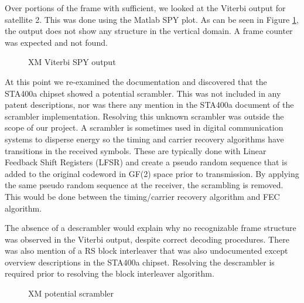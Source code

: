 \documentclass[conference,onecolumn]{IEEEtran}
\begin{document}
Over portions of the frame with sufficient, we looked at the Viterbi output for satellite 2.  This was done using the Matlab SPY plot.  As can be seen in Figure \ref{fig::Viterbi_spy}, the output does not show any structure in the vertical domain.  A frame counter was expected and not found.

\begin{figure}[H]
	\centerline{}
	\caption{XM Viterbi SPY output}
	\label{fig::Viterbi_spy}
\end{figure}

At this point we re-examined the documentation and discovered that the STA400a chipset showed a potential scrambler.  This was not included in any patent descriptions, nor was there any mention in the STA400a document of the scrambler implementation.  Resolving this unknown scrambler was outside the scope of our project.  A scrambler is sometimes used in digital communication systems to disperse energy so the timing and carrier recovery algorithms have transitions in the received symbols.  These are typically done with Linear Feedback Shift Registers (LFSR) and create a pseudo random sequence that is added to the original codeword in GF(2) space prior to transmission.  By applying the same pseudo random sequence at the receiver, the scrambling is removed.  This would be done between the timing/carrier recovery algorithm and FEC algorithm.

The absence of a descrambler would explain why no recognizable frame structure was observed in the Viterbi output, despite correct decoding procedures.  There was also mention of a RS block interleaver that was also undocumented except overview descriptions in the STA400a chipset.  Resolving the descrambler is required prior to resolving the block interleaver algorithm. 

\begin{figure}[H]
	\centerline{}
	\caption{XM potential scrambler \cite{alldatasheetcom_2015_sta400a}}
	\label{fig::scrambler}
\end{figure}
\end{document}
